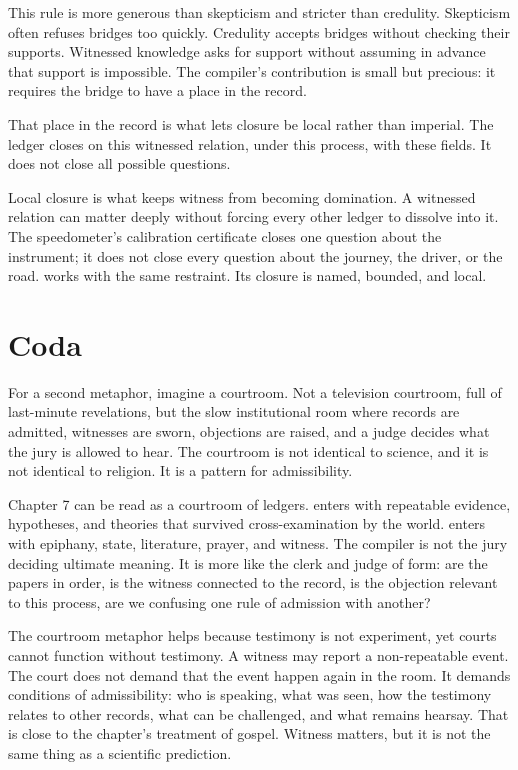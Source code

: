 This rule is more generous than skepticism and stricter than credulity.
Skepticism often refuses bridges too quickly. Credulity accepts bridges without
checking their supports. Witnessed knowledge asks for support without assuming
in advance that support is impossible. The compiler's contribution is small but
precious: it requires the bridge to have a place in the record.

That place in the record is what lets closure be local rather than imperial.
The ledger closes on this witnessed relation, under this process, with these
fields. It does not close all possible questions.

Local closure is what keeps witness from becoming domination. A witnessed
relation can matter deeply without forcing every other ledger to dissolve into
it. The speedometer's calibration certificate closes one question about the
instrument; it does not close every question about the journey, the driver, or
the road.  works with the same restraint. Its closure is named,
bounded, and local.

\section*{Coda}

For a second metaphor, imagine a courtroom. Not a television courtroom, full of
last-minute revelations, but the slow institutional room where records are
admitted, witnesses are sworn, objections are raised, and a judge decides what
the jury is allowed to hear. The courtroom is not identical to science, and it
is not identical to religion. It is a pattern for admissibility.

Chapter 7 can be read as a courtroom of ledgers.  enters with
repeatable evidence, hypotheses, and theories that survived cross-examination
by the world.  enters with epiphany, state, literature, prayer,
and witness. The compiler is not the jury deciding ultimate meaning. It is more
like the clerk and judge of form: are the papers in order, is the witness
connected to the record, is the objection relevant to this process, are we
confusing one rule of admission with another?

The courtroom metaphor helps because testimony is not experiment, yet courts
cannot function without testimony. A witness may report a non-repeatable event.
The court does not demand that the event happen again in the room. It demands
conditions of admissibility: who is speaking, what was seen, how the testimony
relates to other records, what can be challenged, and what remains hearsay.
That is close to the chapter's treatment of gospel. Witness matters, but it is
not the same thing as a scientific prediction.

